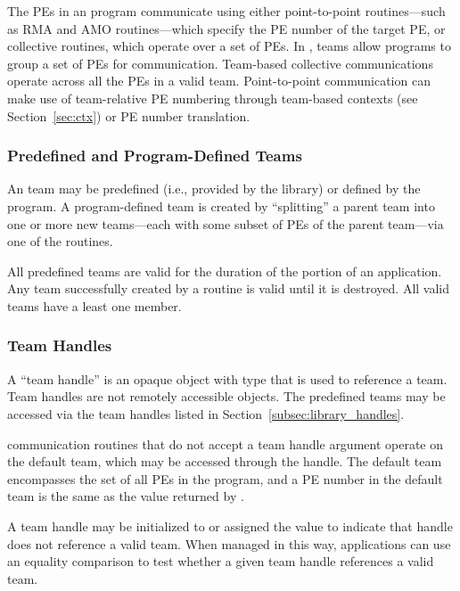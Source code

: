 The \acp{PE} in an \openshmem program communicate using either
point-to-point routines---such as \ac{RMA} and \ac{AMO} routines---which specify the \ac{PE} number of the target
\ac{PE}, or collective routines, which operate over a set of \acp{PE}.
In \openshmem, teams allow programs to group a set of \acp{PE} for
communication.
Team-based collective communications operate across all the \acp{PE}
in a valid team.
Point-to-point communication can make use of team-relative \ac{PE}
numbering through team-based contexts (see Section~\ref{sec:ctx}) or
\ac{PE} number translation.

\subsubsection*{Predefined and Program-Defined Teams}

An \openshmem team may be predefined (i.e., provided by the \openshmem
library) or defined by the \openshmem program.
A program-defined team is created by ``splitting'' a parent team into
one or more new teams---each with some subset of \acp{PE} of the
parent team---via one of the  routines.

All predefined teams are valid for the duration of the \openshmem
portion of an application.
Any team successfully created by a 
routine is valid until it is destroyed.
All valid teams have a least one member.

\subsubsection*{Team Handles}

A ``team handle'' is an opaque object with type 
that is used to reference a team.
Team handles are not remotely accessible objects.
The predefined teams may be accessed via the team handles listed in
Section~\ref{subsec:library_handles}.

\openshmem communication routines that do not accept a team handle
argument operate on the default team, which may be accessed through
the  handle.
The default team encompasses the set of all \acp{PE} in the \openshmem
program, and a \ac{PE} number in the default team is the same as the
value returned by .

A team handle may be initialized to or assigned the value
 to indicate that handle does not
reference a valid team.
When managed in this way, applications can use an equality comparison
to test whether a given team handle references a valid team.

